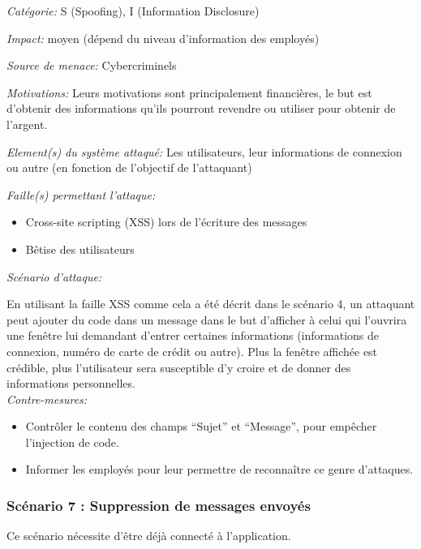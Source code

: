 \documentclass{article}
\begin{document}
\textit{Catégorie:} S (Spoofing), I (Information Disclosure)

\textit{Impact:} moyen (dépend du niveau d'information des employés)

\textit{Source de menace:} Cybercriminels

\textit{Motivations:} Leurs motivations sont principalement financières, le but est
  d'obtenir des informations qu'ils pourront revendre ou utiliser pour
  obtenir de l'argent.

\textit{Element(s) du système attaqué:} Les utilisateurs, leur
informations de connexion ou autre (en fonction de l'objectif de
l'attaquant)

\textit{Faille(s) permettant l'attaque:}

\begin{itemize}

\item
  Cross-site scripting (XSS) lors de l'écriture des messages
\item
  Bêtise des utilisateurs
\end{itemize}

\textit{Scénario d'attaque:}

En utilisant la faille XSS comme cela a été décrit dans le scénario 4,
un attaquant peut ajouter du code dans un message dans le but d'afficher
à celui qui l'ouvrira une fenêtre lui demandant d'entrer certaines
informations (informations de connexion, numéro de carte de crédit ou
autre). Plus la fenêtre affichée est crédible, plus l'utilisateur sera
susceptible d'y croire et de donner des informations personnelles.\\

\textit{Contre-mesures:}

\begin{itemize}

\item
  Contrôler le contenu des champs ``Sujet'' et ``Message'', pour
  empêcher l'injection de code.
\item
  Informer les employés pour leur permettre de reconnaître ce genre
  d'attaques.
\end{itemize}

\subsubsection{Scénario 7 : Suppression de messages envoyés}

Ce scénario nécessite d'être déjà connecté à l'application.\\
\end{document}
